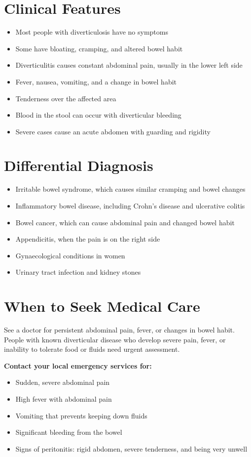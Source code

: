 \section*{Clinical Features}
\begin{itemize}
    \item Most people with diverticulosis have no symptoms
    \item Some have bloating, cramping, and altered bowel habit
    \item Diverticulitis causes constant abdominal pain, usually in the lower left side
    \item Fever, nausea, vomiting, and a change in bowel habit
    \item Tenderness over the affected area
    \item Blood in the stool can occur with diverticular bleeding
    \item Severe cases cause an acute abdomen with guarding and rigidity
\end{itemize}

\section*{Differential Diagnosis}
\begin{itemize}
    \item Irritable bowel syndrome, which causes similar cramping and bowel changes
    \item Inflammatory bowel disease, including Crohn's disease and ulcerative colitis
    \item Bowel cancer, which can cause abdominal pain and changed bowel habit
    \item Appendicitis, when the pain is on the right side
    \item Gynaecological conditions in women
    \item Urinary tract infection and kidney stones
\end{itemize}

\section*{When to Seek Medical Care}
See a doctor for persistent abdominal pain, fever, or changes in bowel habit. People with known diverticular disease who develop severe pain, fever, or inability to tolerate food or fluids need urgent assessment.

\textbf{Contact your local emergency services for:}
\begin{itemize}
    \item Sudden, severe abdominal pain
    \item High fever with abdominal pain
    \item Vomiting that prevents keeping down fluids
    \item Significant bleeding from the bowel
    \item Signs of peritonitis: rigid abdomen, severe tenderness, and being very unwell
\end{itemize}

